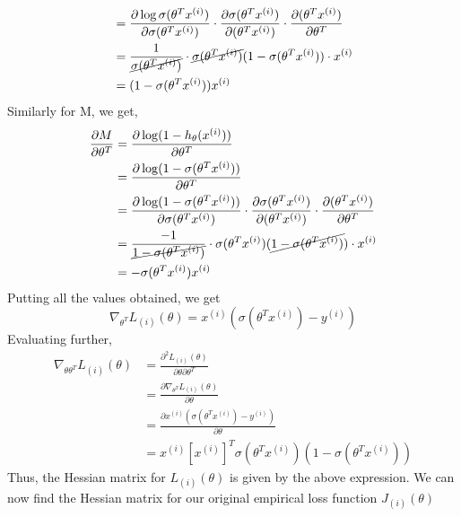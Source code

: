 \documentclass[12pt]{article}
\begin{document}
\begin{flushleft}
\begin{equation}
\begin{aligned}
    &=\frac{\partial \log \sigma(\theta^T x^{(i)})}{\partial \sigma(\theta^T x^{(i)})}\cdot\frac{\partial \sigma(\theta^T x^{(i)})}{\partial (\theta^T x^{(i)})}\cdot\frac{\partial (\theta^T x^{(i)})}{\partial \theta^T}\\
    &=\frac{1}{\cancel{\sigma(\theta^T x^{(i)})}}\cdot\cancel{\sigma(\theta^T x^{(i)})}(1-\sigma(\theta^T x^{(i)}))\cdot x^{(i)}\\
    &=(1-\sigma(\theta^T x^{(i)}))x^{(i)}
\end{aligned}
\end{equation}
Similarly for M, we get,
\begin{equation}
\begin{aligned}
\frac{\partial M}{\partial \theta^T}
    &=\frac{\partial \log(1- h_\theta(x^{(i)}))}{\partial \theta^T}\\
    &=\frac{\partial \log(1- \sigma(\theta^T x^{(i)}))}{\partial \theta^T}\\
    &=\frac{\partial \log (1-\sigma(\theta^T x^{(i)}))}{\partial \sigma(\theta^T x^{(i)})}\cdot\frac{\partial \sigma(\theta^T x^{(i)})}{\partial (\theta^T x^{(i)})}\cdot\frac{\partial (\theta^T x^{(i)})}{\partial \theta^T}\\
    &=\frac{-1}{\cancel{1-\sigma(\theta^T x^{(i)})}}\cdot\sigma(\theta^T x^{(i)})(\cancel{1-\sigma(\theta^T x^{(i)})})\cdot x^{(i)}\\
    &=-\sigma(\theta^T x^{(i)}) x^{(i)}
\end{aligned}
\end{equation}
Putting all the values obtained, we get
\begin{equation}
    \nabla_{\theta^T} L_{(i)}(\theta)=x^{(i)}(\sigma(\theta^T x^{(i)})-y^{(i)})
\end{equation}
Evaluating further, 
\begin{equation}
\begin{aligned}
\nabla_{\theta\theta^T}L_{(i)}(\theta)&=\frac{{\partial^2} L_{(i)}(\theta)}{\partial \theta \partial \theta^T}\\
    &=\frac{\partial \nabla_{\theta^T} L_{(i)}(\theta)}{\partial \theta}\\
    &=\frac{\partial x^{(i)}(\sigma(\theta^T x^{(i)})-y^{(i)})}{\partial \theta}\\
    &=x^{(i)}[x^{(i)}]^T\sigma(\theta^T x^{(i)})(1-\sigma(\theta^T x^{(i)}))
\end{aligned}
\end{equation}
Thus, the Hessian matrix for $L_{(i)}(\theta)$ is given by the above expression. We can now find the Hessian matrix for our original empirical loss function $J_{(i)}(\theta)$

\end{flushleft}
\end{document}
